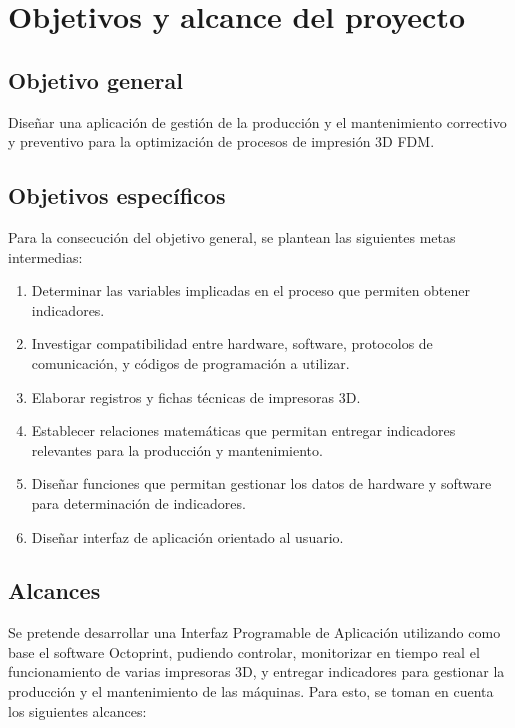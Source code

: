\section{Objetivos y alcance del proyecto}
\label{intro:objetivos}

\subsection{Objetivo general}

Diseñar una aplicación de gestión de la producción y el mantenimiento correctivo y preventivo para la optimización de procesos de impresión 3D FDM.

\subsection{Objetivos espec\'ificos}

Para la consecución del objetivo general, se plantean las siguientes metas intermedias:

\begin{enumerate}
 
	\item Determinar las variables implicadas en el proceso que permiten obtener indicadores.
	\item Investigar compatibilidad entre hardware, software, protocolos de comunicación, y códigos de programación a utilizar.
	\item Elaborar registros y fichas técnicas de impresoras 3D.
	\item Establecer relaciones matemáticas que permitan entregar indicadores relevantes para la producción y mantenimiento.
	\item Diseñar funciones que permitan gestionar los datos de hardware y software para determinación de indicadores.
	\item Diseñar interfaz de aplicación orientado al usuario. 
	
\end{enumerate} 
\subsection{Alcances}

Se pretende desarrollar una Interfaz Programable de Aplicación utilizando como base el software Octoprint, pudiendo controlar, monitorizar en tiempo real el funcionamiento de varias impresoras 3D, y entregar indicadores para gestionar la producción y el mantenimiento de las máquinas. Para esto, se toman en cuenta los siguientes alcances:

